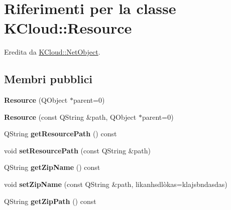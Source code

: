 \hypertarget{class_k_cloud_1_1_resource}{\section{Riferimenti per la classe K\-Cloud\-:\-:Resource}
\label{class_k_cloud_1_1_resource}
}


Eredita da \hyperlink{class_k_cloud_1_1_net_object}{K\-Cloud\-::\-Net\-Object}.

\subsection*{Membri pubblici}
\begin{DoxyCompactItemize}
\item 
\hypertarget{class_k_cloud_1_1_resource_a3dd2afa53e60ac97f16f50e8f82a7bcd}{{\bfseries Resource} (Q\-Object $\ast$parent=0)}\label{class_k_cloud_1_1_resource_a3dd2afa53e60ac97f16f50e8f82a7bcd}

\item 
\hypertarget{class_k_cloud_1_1_resource_a24579d14126dd79675aa0bef20939564}{{\bfseries Resource} (const Q\-String \&path, Q\-Object $\ast$parent=0)}\label{class_k_cloud_1_1_resource_a24579d14126dd79675aa0bef20939564}

\item 
\hypertarget{class_k_cloud_1_1_resource_abf092ffb39142ff0642768126c709d4d}{Q\-String {\bfseries get\-Resource\-Path} () const }\label{class_k_cloud_1_1_resource_abf092ffb39142ff0642768126c709d4d}

\item 
\hypertarget{class_k_cloud_1_1_resource_af458f276a7b1c0cf5ce4b91da4357079}{void {\bfseries set\-Resource\-Path} (const Q\-String \&path)}\label{class_k_cloud_1_1_resource_af458f276a7b1c0cf5ce4b91da4357079}

\item 
\hypertarget{class_k_cloud_1_1_resource_ab2a8ba8a305e529c3ecb41b00c63b6b2}{Q\-String {\bfseries get\-Zip\-Name} () const }\label{class_k_cloud_1_1_resource_ab2a8ba8a305e529c3ecb41b00c63b6b2}

\item 
\hypertarget{class_k_cloud_1_1_resource_a602610b5af12e6787a74181e5603991b}{void {\bfseries set\-Zip\-Name} (const Q\-String \&path, likanhsdlòkas=klajsbndasdas)}\label{class_k_cloud_1_1_resource_a602610b5af12e6787a74181e5603991b}

\item 
\hypertarget{class_k_cloud_1_1_resource_ada28810269938beecba3b620f84ead30}{Q\-String {\bfseries get\-Zip\-Path} () const }\label{class_k_cloud_1_1_resource_ada28810269938beecba3b620f84ead30}


\end{DoxyCompactItemize}
